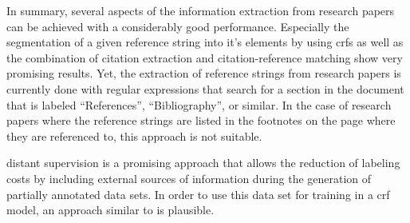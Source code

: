 In summary, several aspects of the information extraction from research papers can be achieved with a considerably good performance.
Especially the segmentation of a given reference string into it's elements by using \glspl{crf} \citep{peng2004accurate,councill2008parscit,groza2012reference} as well as the combination of citation extraction and citation-reference matching \citep{powley2007evidence} show very promising results.
Yet, the extraction of reference strings from research papers is currently done with regular expressions that search for a section in the document that is labeled ``References'', ``Bibliography'', or similar.
In the case of research papers where the reference strings are listed in the footnotes on the page where they are referenced to, this approach is not suitable.

\Gls{distant supervision} is a promising approach that allows the reduction of labeling costs by including external sources of information during the generation of partially annotated data sets.
In order to use this data set for training in a \gls{crf} model, an approach similar to \citet{tsuboi2008training} is plausible.


